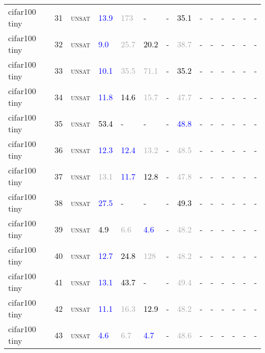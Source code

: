 \begin{center}
{\begin{longtable}{@{}llllllllllllll@{}}
cifar100 tiny & 31 & \textsc{unsat} & \textcolor{blue}{13.9} & \textcolor{darkgray}{173} & - & - & \textcolor{black}{35.1} & - & - & - & - & - & - \\
cifar100 tiny & 32 & \textsc{unsat} & \textcolor{blue}{9.0} & \textcolor{darkgray}{25.7} & \textcolor{black}{20.2} & - & \textcolor{darkgray}{38.7} & - & - & - & - & - & - \\
cifar100 tiny & 33 & \textsc{unsat} & \textcolor{blue}{10.1} & \textcolor{darkgray}{35.5} & \textcolor{darkgray}{71.1} & - & \textcolor{black}{35.2} & - & - & - & - & - & - \\
cifar100 tiny & 34 & \textsc{unsat} & \textcolor{blue}{11.8} & \textcolor{black}{14.6} & \textcolor{darkgray}{15.7} & - & \textcolor{darkgray}{47.7} & - & - & - & - & - & - \\
cifar100 tiny & 35 & \textsc{unsat} & \textcolor{black}{53.4} & - & - & - & \textcolor{blue}{48.8} & - & - & - & - & - & - \\
cifar100 tiny & 36 & \textsc{unsat} & \textcolor{blue}{12.3} & \textcolor{blue}{12.4} & \textcolor{darkgray}{13.2} & - & \textcolor{darkgray}{48.5} & - & - & - & - & - & - \\
cifar100 tiny & 37 & \textsc{unsat} & \textcolor{darkgray}{13.1} & \textcolor{blue}{11.7} & \textcolor{black}{12.8} & - & \textcolor{darkgray}{47.8} & - & - & - & - & - & - \\
cifar100 tiny & 38 & \textsc{unsat} & \textcolor{blue}{27.5} & - & - & - & \textcolor{black}{49.3} & - & - & - & - & - & - \\
cifar100 tiny & 39 & \textsc{unsat} & \textcolor{black}{4.9} & \textcolor{darkgray}{6.6} & \textcolor{blue}{4.6} & - & \textcolor{darkgray}{48.2} & - & - & - & - & - & - \\
cifar100 tiny & 40 & \textsc{unsat} & \textcolor{blue}{12.7} & \textcolor{black}{24.8} & \textcolor{darkgray}{128} & - & \textcolor{darkgray}{48.2} & - & - & - & - & - & - \\
cifar100 tiny & 41 & \textsc{unsat} & \textcolor{blue}{13.1} & \textcolor{black}{43.7} & - & - & \textcolor{darkgray}{49.4} & - & - & - & - & - & - \\
cifar100 tiny & 42 & \textsc{unsat} & \textcolor{blue}{11.1} & \textcolor{darkgray}{16.3} & \textcolor{black}{12.9} & - & \textcolor{darkgray}{48.2} & - & - & - & - & - & - \\
cifar100 tiny & 43 & \textsc{unsat} & \textcolor{blue}{4.6} & \textcolor{darkgray}{6.7} & \textcolor{blue}{4.7} & - & \textcolor{darkgray}{48.6} & - & - & - & - & - & - \\

\end{longtable}}
\end{center}
